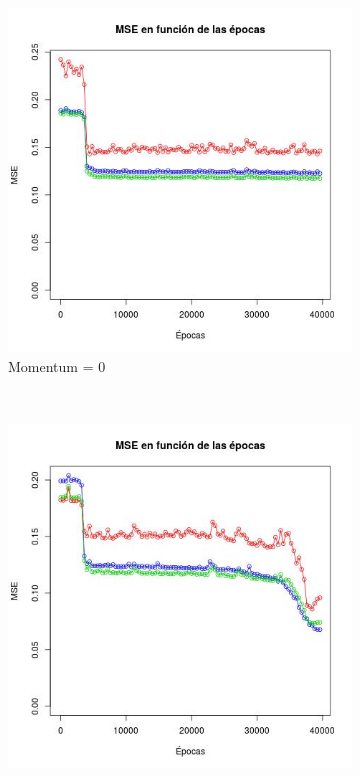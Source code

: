\documentclass[12pt, a4paper]{article}
\begin{document}
\begin{figure}
    \centering

    \begin{subfigure}[b]{0.45\textwidth}
        \includegraphics[width=\textwidth]{mse12}
        \caption{Momentum = 0}
    \end{subfigure}
      ~ %
    \begin{subfigure}[b]{0.45\textwidth}
        \includegraphics[width=\textwidth]{mse12e}

\end{subfigure}
\end{figure}
\end{document}
